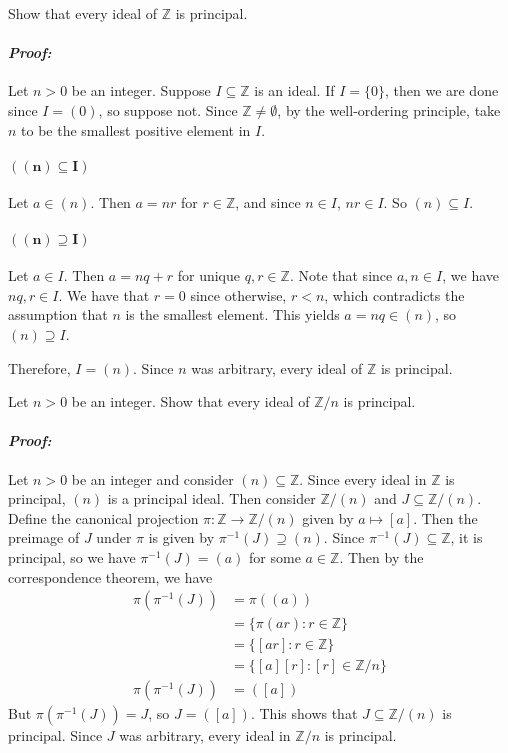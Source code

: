 \documentclass [12pt] {article}
\newcommand{\Z}{\mathbb{Z}}
\renewcommand{\it}[1]{\textit{{#1}}}
\newenvironment{problem}{\begin{tcolorbox}[title=Problem,colback=black!5!white,colframe=black!75!black]}{\end{tcolorbox}}
\newenvironment{response}{\begin{responseframe}\vspace{-10pt}\paragraph{\it{Proof:}}}{\end{responseframe}}
\begin{document}
\begin{problem}
    Show that every ideal of $\Z$ is principal.
\end{problem}
\begin{response}
    Let $n>0$ be an integer. Suppose $I\subseteq \Z$ is an ideal. If $I=\{0\}$,
    then we are done since $I=(0)$, so suppose not. Since $\Z\neq \emptyset$,
    by the well-ordering principle, take $n$ to be the smallest positive
    element in $I$.

    \paragraph{$\bm{((n)\subseteq I)}$} Let $a\in (n)$. Then $a = nr$ for
    $r\in \Z$, and since $n\in I$, $nr\in I$. So $(n)\subseteq I$.

    \paragraph{$\bm{((n)\supseteq I)}$} Let $a\in I$. Then $a=nq+r$ for unique
    $q,r\in \Z$. Note that since $a,n\in I$, we have $nq,r\in I$. We have that
    $r=0$ since otherwise, $r<n$, which contradicts the assumption that $n$ is
    the smallest element. This yields $a=nq\in (n)$, so $(n)\supseteq I$.
    \vspace{1em}

    Therefore, $I=(n)$. Since $n$ was arbitrary, every ideal of $\Z$ is
    principal.
\end{response}

\begin{problem}
    Let $n>0$ be an integer. Show that every ideal of $\Z/n$ is principal.
\end{problem}
\begin{response}
    Let $n>0$ be an integer and consider $(n)\subseteq \Z$. Since every ideal in
    $\Z$ is principal, $(n)$ is a principal ideal. Then consider $\Z/(n)$ and
    $J\subseteq \Z/(n)$. Define the canonical projection $\pi : \Z \to \Z/(n)$
    given by $a\mapsto [a]$. Then the preimage of $J$ under $\pi$ is given by
    $\pi^{-1}(J) \supseteq (n)$. Since $\pi^{-1}(J)\subseteq \Z$, it is
    principal, so we have $\pi^{-1}(J)=(a)$ for some $a\in \Z$. Then by the
    correspondence theorem, we have
    \begin{align*}
        \pi(\pi^{-1}(J))&=\pi((a)) \\
                        &=\{\pi(ar):r\in \Z\} \\
                        &=\{[ar]:r\in \Z\} \\
                        &=\{[a][r]:[r]\in \Z/n\} \\
        \pi(\pi^{-1}(J))&=([a])
    \end{align*}
    But $\pi(\pi^{-1}(J))=J$, so $J=([a])$. This shows that $J\subseteq \Z/(n)$
    is principal. Since $J$ was arbitrary, every ideal in $\Z/n$ is principal.
\end{response}
\newpage
\end{document}
